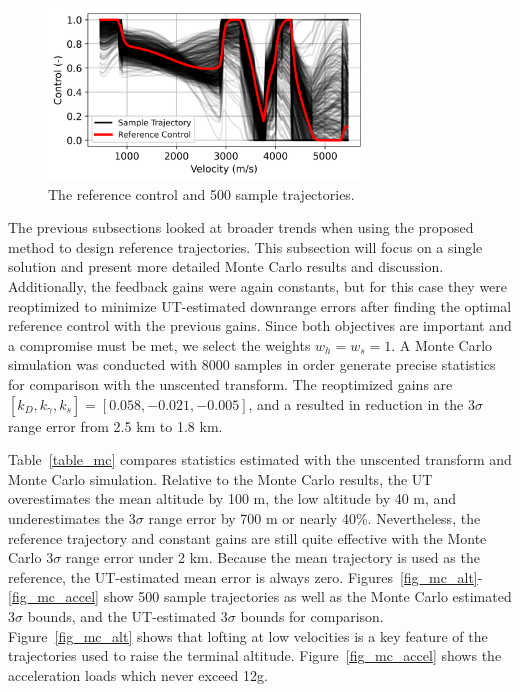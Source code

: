 \documentclass[journal ]{new-aiaa}
\begin{document}
\begin{figure}[h!]
	\centering
	\includegraphics[width=0.75\textwidth]{ddp/python/Control}
	\caption{The reference control and 500 sample trajectories.}
	\label{fig_mc_control}
\end{figure}
The previous subsections looked at broader trends when using the proposed method to design reference trajectories. This subsection will focus on a single solution and present more detailed Monte Carlo results and discussion. Additionally, the feedback gains were again constants, but for this case they were reoptimized to minimize UT-estimated downrange errors after finding the optimal reference control with the previous gains. Since both objectives are important and a compromise must be met, we select the weights $w_h=w_s=1$. A Monte Carlo simulation was conducted with 8000 samples in order generate precise statistics for comparison with the unscented transform. The reoptimized gains are $[k_D, k_{\gamma}, k_s] = [0.058, -0.021, -0.005]$, and a resulted in reduction in the 3$\sigma$ range error from 2.5 km to 1.8 km.

Table~\ref{table_mc} compares statistics estimated with the unscented transform and Monte Carlo simulation. Relative to the Monte Carlo results, the UT overestimates the mean altitude by 100 m, the low altitude by 40 m, and underestimates the 3$ \sigma $ range error by 700 m or nearly 40\%. Nevertheless, the reference trajectory and constant gains are still quite effective with the Monte Carlo 3$ \sigma $ range error under 2 km. Because the mean trajectory is used as the reference, the UT-estimated mean error is always zero. 
Figures~\ref{fig_mc_alt}-\ref{fig_mc_accel} show 500 sample trajectories as well as the Monte Carlo estimated 3$\sigma$ bounds, and the UT-estimated 3$\sigma$ bounds for comparison. Figure~\ref{fig_mc_alt} shows that lofting at low velocities is a key feature of the trajectories used to raise the terminal altitude. Figure~\ref{fig_mc_accel} shows the acceleration loads which never exceed 12g.
\end{document}
